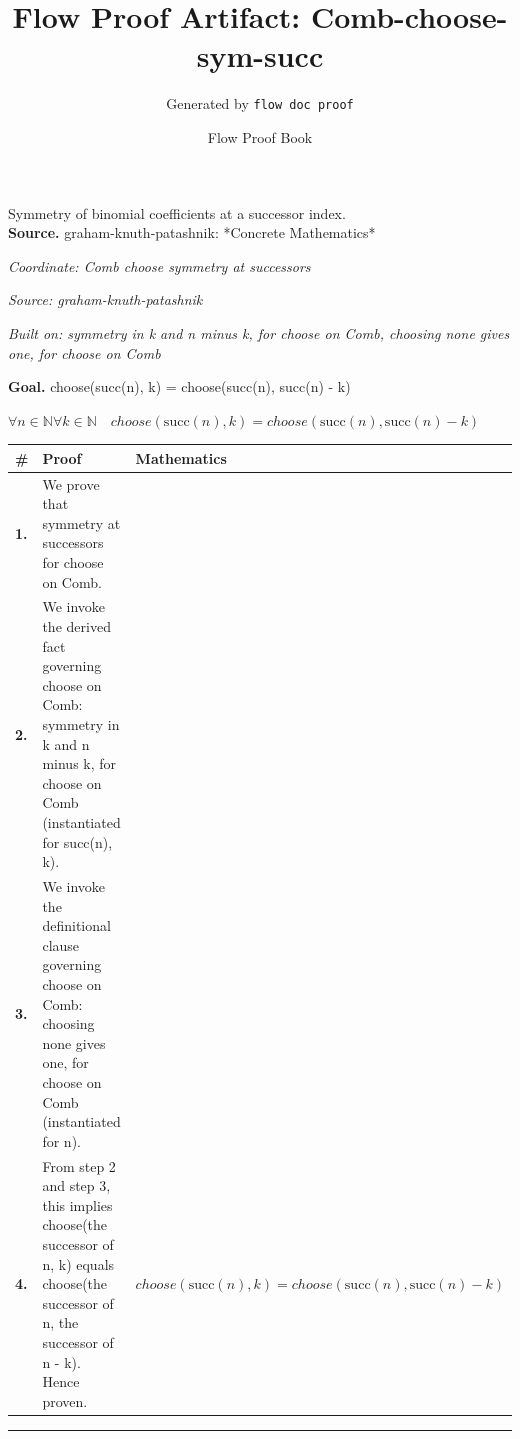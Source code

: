 \documentclass[11pt]{article}
\title{Flow Proof Artifact: Comb-choose-sym-succ}
\author{Generated by \texttt{flow doc proof}}
\date{Flow Proof Book}
\theoremstyle{definition}
\begin{document}
\maketitle
Symmetry of binomial coefficients at a successor index.\\[0.5em]
\textbf{Source.} graham-knuth-patashnik: *Concrete Mathematics*\\[0.5em]
\bigskip
{}\par
\smallskip\noindent\textit{Coordinate: Comb \cdot choose \cdot symmetry at successors}\par
\smallskip\noindent\textit{Source: graham-knuth-patashnik}\par
\smallskip\noindent\textit{Built on: symmetry in k and n minus k, for choose on Comb, choosing none gives one, for choose on Comb}\par
\medskip
\noindent\textbf{Goal.} choose(succ(n), k) = choose(succ(n), succ(n) - k)\par
\noindent$\displaystyle \forall n \in \mathbb{N} \forall k \in \mathbb{N}\quad choose(\mathrm{succ}(n), k) = choose(\mathrm{succ}(n), \mathrm{succ}(n) - k)$\par
\medskip
\noindent
\begin{tabular}{@{} >{\raggedright\arraybackslash}p{} >{\raggedright\arraybackslash}p{} >{\raggedleft\arraybackslash}p{} @{}}
\textbf{\#} & \textbf{Proof} & \textbf{Mathematics} \\
\midrule
\textbf{1.} & We prove that symmetry at successors for choose on Comb. & \\[0.45em]
\textbf{2.} & We invoke the derived fact governing choose on Comb: symmetry in k and n minus k, for choose on Comb (instantiated for succ(n), k). & \\[0.45em]
\textbf{3.} & We invoke the definitional clause governing choose on Comb: choosing none gives one, for choose on Comb (instantiated for n). & \\[0.45em]
\textbf{4.} & From step 2 and step 3, this implies choose(the successor of n, k) equals choose(the successor of n, the successor of n - k). Hence proven. & $\displaystyle choose(\mathrm{succ}(n), k) = choose(\mathrm{succ}(n), \mathrm{succ}(n) - k)$ \\[0.45em]
\bottomrule
\end{tabular}
\label{thm:Comb-choose-symmetry_at_successors}
\par\medskip\hrule
\end{document}
